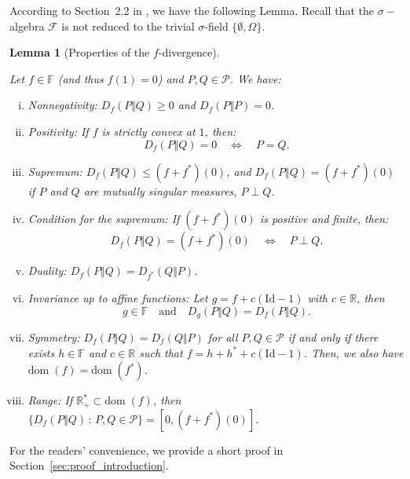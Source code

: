 \documentclass[12pt]{article}
\newcommand{\cf}{{\mathcal F}}
\newcommand{\cp}{{\mathcal P}}
\newcommand{\F}{{\mathbb F}}
\newcommand{\R}{{\mathbb R}}
\newcommand{\dom}{{\mathrm{dom}}\;}
\newcommand{\id}{\mathrm{Id}}
\theoremstyle{plain}
\newtheorem{lem}[theo]{Lemma}
\theoremstyle{remark}
\begin{document}
According to Section~2.2 in \cite{rahman2016f}, we have the following
Lemma. Recall that the $\sigma-$algebra  $\cf$ is  not
      reduced  to the  trivial  $\sigma$-field $\{\emptyset,  \Omega\}$.
\begin{lem}[Properties of the $f$-divergence]
  \label{lem:f_div_properties}

  Let $f\in \F$ (and thus $f(1)=0$) and $P,Q\in \cp$. We have:
\begin{enumerate}[(i)]
    \item \label{enum:f_div_prop_nonnegativity} Nonnegativity: $D_f(P \Vert Q) \geq  0$ and $D_f(P\Vert P)=0$.
    \item \label{enum:f_div_prop_reflexivity} Positivity:  If $f$ is
      strictly convex at $1$, then:
      \[
        D_f(P \Vert Q) = 0
        \quad \Longleftrightarrow\quad
        P = Q.
        \]
    \item \label{enum:div_prop_supremum} Supremum: $D_f(P \Vert Q) \leq
      (f+f^*)(0) $, and  $D_f(P \Vert Q) = (f+f^*)(0)$ if $P$ and $Q$ are mutually singular measures, $P \perp Q$.
    \item   \label{enum:div_prop_condition_sup}    Condition   for   the
      supremum:   If  $(f+f^*)(0)$   is   positive   and  finite,
      then:
      \[
        D_f(P \Vert Q) = (f+f^*)(0)
        \quad \Longleftrightarrow\quad
        P \perp Q.
        \]
    \item \label{enum:f_div_prop_duality} Duality: $D_f(P \Vert Q) = D_{f^*}(Q\Vert P)$.
    \item \label{enum:f_div_prop_invariance} Invariance up to affine functions: Let   $g = f +
      c(\id-1)$ with $c\in \R$, then 
      $$
      g\in \F \quad \text{and}  \quad D_{g}(P\Vert Q) = D_{f}(P\Vert Q).
      $$
    \item  \label{enum:f_div_prop_symmetry} Symmetry:   $D_f(P  \Vert Q) = D_{f}(Q\Vert  P)$ for all $P,Q\in  \cp$ if
      and  only if  there exists  $h\in  \F$ and  $c \in  \R$ such  that
      $f=h+h^* + c(\id-1)$. Then, we also have $\dom(f)=\dom(f^*)$.

    \item \label{enum:f_div_prop_range} Range:
  If  $\R_+^*\subset \dom(f)$, then
  $\{D_f(P\Vert Q) \, \colon\, P,Q\in \cp\}= [0, (f+f^*)(0)]
  $.
\end{enumerate}
\end{lem}

For   the   readers'   convenience,   we  provide   a   short   proof   in
Section~\ref{sec:proof_introduction}.
\end{document}
